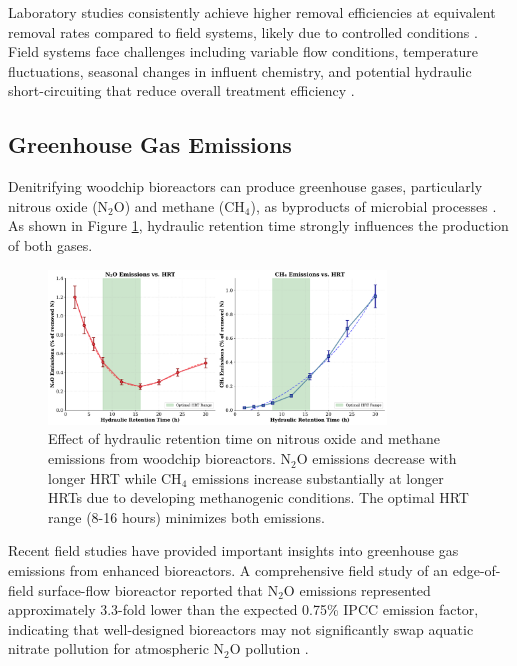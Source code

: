 \documentclass[12pt,a4paper]{article}
\begin{document}
Laboratory studies consistently achieve higher removal efficiencies at equivalent removal rates compared to field systems, likely due to controlled conditions \citep{new_ref_4}. Field systems face challenges including variable flow conditions, temperature fluctuations, seasonal changes in influent chemistry, and potential hydraulic short-circuiting that reduce overall treatment efficiency \citep{RN312, RN309}.

\subsection{Greenhouse Gas Emissions}

Denitrifying woodchip bioreactors can produce greenhouse gases, particularly nitrous oxide (N$_{2}$O) and methane (CH$_{4}$), as byproducts of microbial processes \citep{RN1181, new_ref_4}. As shown in Figure \ref{fig:greenhouse_gas}, hydraulic retention time strongly influences the production of both gases.

\begin{figure}[ht]
\centering
\includegraphics[width=0.8\textwidth]{fig6_greenhouse_gas_scientific}
\caption{Effect of hydraulic retention time on nitrous oxide and methane emissions from woodchip bioreactors. N$_2$O emissions decrease with longer HRT while CH$_4$ emissions increase substantially at longer HRTs due to developing methanogenic conditions. The optimal HRT range (8-16 hours) minimizes both emissions.}
\label{fig:greenhouse_gas}
\end{figure}

Recent field studies have provided important insights into greenhouse gas emissions from enhanced bioreactors. A comprehensive field study of an edge-of-field surface-flow bioreactor reported that N$_{2}$O emissions represented approximately 3.3-fold lower than the expected 0.75\% IPCC emission factor, indicating that well-designed bioreactors may not significantly swap aquatic nitrate pollution for atmospheric N$_{2}$O pollution \citep{RN1181}.
\end{document}
